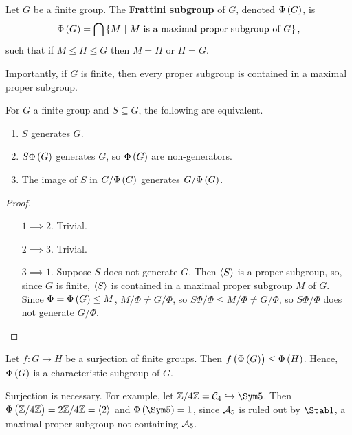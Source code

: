 \begin{definition}
Let $ G $ be a finite group. The \textbf{Frattini subgroup} of $ G $, denoted $ \Phi\br{G} $, is
$$ \Phi\br{G} = \bigcap \cbr{M \st M \ \text{is a maximal proper subgroup of} \ G}, $$
such that if $ M \le H \le G $ then $ M = H $ or $ H = G $.
\end{definition}

Importantly, if $ G $ is finite, then every proper subgroup is contained in a maximal proper subgroup.

\begin{proposition}
For $ G $ a finite group and $ S \subseteq G $, the following are equivalent.
\begin{enumerate}
\item $ S $ generates $ G $.
\item $ S\Phi\br{G} $ generates $ G $, so $ \Phi\br{G} $ are non-generators.
\item The image of $ S $ in $ G / \Phi\br{G} $ generates $ G / \Phi\br{G} $.
\end{enumerate}
\end{proposition}

\begin{proof}
\hfill
\begin{itemize}[leftmargin=0.5in]
\item[$ 1 \implies 2 $.] Trivial.
\item[$ 2 \implies 3 $.] Trivial.
\item[$ 3 \implies 1 $.] Suppose $ S $ does not generate $ G $. Then $ \left\langle S \right\rangle $ is a proper subgroup, so, since $ G $ is finite, $ \left\langle S \right\rangle $ is contained in a maximal proper subgroup $ M $ of $ G $. Since $ \Phi = \Phi\br{G} \le M $, $ M / \Phi \ne G / \Phi $, so $ S\Phi / \Phi \le M / \Phi \ne G / \Phi $, so $ S\Phi / \Phi $ does not generate $ G / \Phi $.
\end{itemize}
\end{proof}


\begin{proposition}
Let $ f : G \to H $ be a surjection of finite groups. Then $ f\br{\Phi\br{G}} \le \Phi\br{H} $. Hence, $ \Phi\br{G} $ is a characteristic subgroup of $ G $.
\end{proposition}

\begin{remark}
Surjection is necessary. For example, let $ \ZZ / 4\ZZ = \CCC_4 \hookrightarrow \Sym 5 $. Then $ \Phi\br{\ZZ / 4\ZZ} = 2\ZZ / 4\ZZ = \abr{2} $ and $ \Phi\br{\Sym 5} = 1 $, since $ \mathcal{A}_5 $ is ruled out by $ \Stab 1 $, a maximal proper subgroup not containing $ \mathcal{A}_5 $.
\end{remark}

